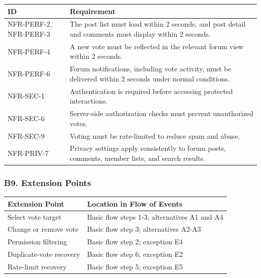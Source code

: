 \documentclass[12pt]{article}
\renewcommand{\baselinestretch}{1.5}
\begin{document}
\begingroup
\small
\renewcommand{\baselinestretch}{1.0}\selectfont
\renewcommand{\arraystretch}{1.15}
\setlength{\tabcolsep}{6pt}
\begin{longtable}{|>{\raggedright\arraybackslash}p{}|>{\raggedright\arraybackslash}p{}|}
\hline
\textbf{ID} & \textbf{Requirement} \\ \hline
\endhead
NFR-PERF-2, NFR-PERF-3 & The post list must load within 2 seconds, and post detail and comments must display within 2 seconds. \\ \hline
NFR-PERF-4 & A new vote must be reflected in the relevant forum view within 2 seconds. \\ \hline
NFR-PERF-6 & Forum notifications, including vote activity, must be delivered within 2 seconds under normal conditions. \\ \hline
NFR-SEC-1 & Authentication is required before accessing protected interactions. \\ \hline
NFR-SEC-6 & Server-side authorization checks must prevent unauthorized votes. \\ \hline
NFR-SEC-9 & Voting must be rate-limited to reduce spam and abuse. \\ \hline
NFR-PRIV-7 & Privacy settings apply consistently to forum posts, comments, member lists, and search results. \\ \hline
\end{longtable}
\endgroup
\par\medskip

\hypertarget{sec:b9-extension-points}{}
\subsubsection*{B9. Extension Points}
\par\medskip

\begingroup
\small
\renewcommand{\baselinestretch}{1.0}\selectfont
\renewcommand{\arraystretch}{1.15}
\setlength{\tabcolsep}{6pt}
\begin{longtable}{|>{\raggedright\arraybackslash}p{}|>{\raggedright\arraybackslash}p{}|}
\hline
\textbf{Extension Point} & \textbf{Location in Flow of Events} \\ \hline
\endhead
Select vote target & Basic flow steps 1-3; alternatives A1 and A4 \\ \hline
Change or remove vote & Basic flow step 3; alternatives A2-A3 \\ \hline
Permission filtering & Basic flow step 2; exception E4 \\ \hline
Duplicate-vote recovery & Basic flow step 6; exception E2 \\ \hline
Rate-limit recovery & Basic flow step 5; exception E5 \\ \hline
\end{longtable}
\endgroup
\par\medskip
\end{document}
